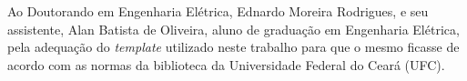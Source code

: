 Ao Doutorando em Engenharia Elétrica, Ednardo Moreira Rodrigues, e seu assistente, Alan Batista de Oliveira, aluno de graduação em Engenharia Elétrica, 
pela adequação do \textit{template} utilizado neste trabalho para que o mesmo ficasse de acordo com as normas da biblioteca da Universidade Federal do Ceará (UFC).